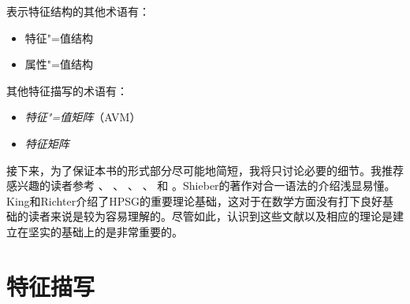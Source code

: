 表示特征结构的其他术语有：
\begin{itemize}
\item 特征"=值结构
\item 属性"=值结构
\end{itemize}
其他特征描写的术语有：
\begin{itemize}
\item \emph{特征"=值矩阵}（AVM）
\item \emph{特征矩阵}
\end{itemize}
接下来，为了保证本书的形式部分尽可能地简短，我将只讨论必要的细节。我推荐感兴趣的读者参考 \citet{Shieber86a}、 \citet[第2章]{ps}、 \citet{Johnson88}、 \citet{Carpenter92a}、 \citet{King94a}和 \citet{Richter2004a-u}。Shieber的著作对合一语法的介绍浅显易懂。King和Richter介绍了HPSG的重要理论基础，这对于在数学方面没有打下良好基础的读者来说是较为容易理解的。尽管如此，认识到这些文献以及相应的理论是建立在坚实的基础上的是非常重要的。

\section{特征描写}

